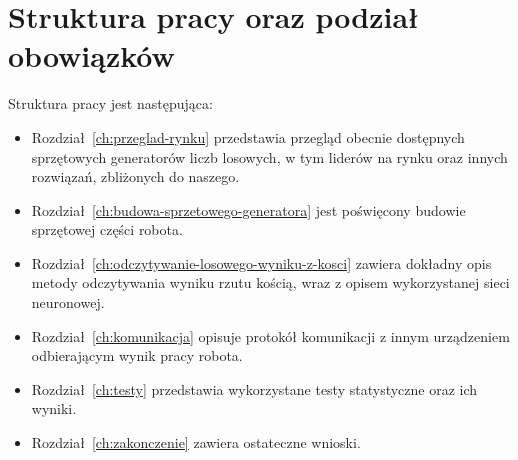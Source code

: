 \section{Struktura pracy oraz podział obowiązków}\label{sec:struktura-pracy-oraz-podzia-obowiazkow}

Struktura pracy jest następująca:
\begin{itemize}
    \item Rozdział~\ref{ch:przeglad-rynku} przedstawia przegląd obecnie dostępnych sprzętowych generatorów liczb losowych,
    w tym liderów na rynku oraz innych rozwiązań, zbliżonych do naszego.
    \item Rozdział~\ref{ch:budowa-sprzetowego-generatora} jest poświęcony budowie sprzętowej części robota.
    \item Rozdział~\ref{ch:odczytywanie-losowego-wyniku-z-kosci} zawiera dokładny opis metody odczytywania wyniku rzutu kością,
    wraz z opisem wykorzystanej sieci neuronowej.
    \item Rozdział~\ref{ch:komunikacja} opisuje protokół komunikacji z innym urządzeniem odbierającym wynik pracy robota.
    \item Rozdział~\ref{ch:testy} przedstawia wykorzystane testy statystyczne oraz ich wyniki.
    \item Rozdział~\ref{ch:zakonczenie} zawiera ostateczne wnioski.
\end{itemize}


